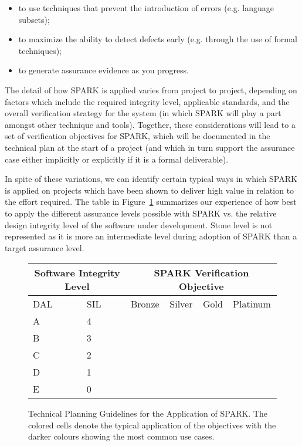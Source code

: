 \documentclass{llncs}
\begin{document}
\begin{itemize}
\item to use techniques that prevent the introduction of errors (e.g. language
  subsets);
\item to maximize the ability to detect defects early (e.g. through the use of
  formal techniques);
\item to generate assurance evidence as you progress.
\end{itemize}

The detail of how SPARK is applied varies from project to project, depending on
factors which include the required integrity level, applicable standards, and
the overall verification strategy for the system (in which SPARK will play a
part amongst other technique and tools). Together, these considerations will
lead to a set of verification objectives for SPARK, which will be documented in
the technical plan at the start of a project (and which in turn support the
assurance case either implicitly or explicitly if it is a formal deliverable).

In spite of these variations, we can identify certain typical ways in which
SPARK is applied on projects which have been shown to deliver high value in
relation to the effort required. The table in Figure~\ref{fig:levels}
summarizes our experience of how best to apply the different assurance levels
possible with SPARK vs. the relative design integrity level of the software
under development.  Stone level is not represented as it is more an
intermediate level during adoption of SPARK than a target assurance level.

\begin{figure}

\begin{center}
\begin{tabular}{|p{1.5cm}|p{1.5cm}|p{1.5cm}|p{1.5cm}|p{1.5cm}|p{1.5cm}|} \hline
\multicolumn{2}{|c|}{Software Integrity Level} & \multicolumn{4}{c|}{SPARK Verification Objective} \\  \hline
DAL & SIL & Bronze & Silver & Gold & Platinum \\ \hline
A   & 4   &        & \cellcolor{OliveGreen} & \cellcolor{OliveGreen} & \cellcolor{OliveGreen} \\ \hline
B   & 3   &        & \cellcolor{OliveGreen} & \cellcolor{OliveGreen} & \cellcolor{YellowGreen} \\ \hline
C   & 2   &        & \cellcolor{NavyBlue} & \cellcolor{NavyBlue} & \\ \hline
D   & 1   &        & \cellcolor{NavyBlue} & \cellcolor{TealBlue} & \\ \hline
E   & 0   & \cellcolor{Orchid} & \cellcolor{Fuchsia} & & \\ \hline
\end{tabular}
\end{center}

\caption{Technical Planning Guidelines for the Application of SPARK.  The
  colored cells denote the typical application of the objectives with the
  darker colours showing the most common use cases.}
\label{fig:levels}
\end{figure}
\end{document}
